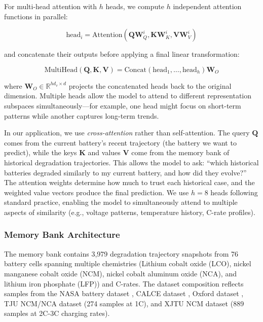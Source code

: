 \documentclass[5p,times,authoryear]{elsarticle}
\begin{document}
For multi-head attention with $h$ heads, we compute $h$ independent attention functions in parallel:

\begin{equation}
\text{head}_i = \text{Attention}(\mathbf{Q}\mathbf{W}_Q^i, \mathbf{K}\mathbf{W}_K^i, \mathbf{V}\mathbf{W}_V^i)
\label{eq:multihead_individual}
\end{equation}

and concatenate their outputs before applying a final linear transformation:

\begin{equation}
\text{MultiHead}(\mathbf{Q}, \mathbf{K}, \mathbf{V}) = \text{Concat}(\text{head}_1, \ldots, \text{head}_h)\mathbf{W}_O
\label{eq:multihead_concat}
\end{equation}

where $\mathbf{W}_O \in \mathbb{R}^{hd_v \times d}$ projects the concatenated heads back to the original dimension. Multiple heads allow the model to attend to different representation subspaces simultaneously—for example, one head might focus on short-term patterns while another captures long-term trends.

In our application, we use \textit{cross-attention} rather than self-attention. The query $\mathbf{Q}$ comes from the current battery's recent trajectory (the battery we want to predict), while the keys $\mathbf{K}$ and values $\mathbf{V}$ come from the memory bank of historical degradation trajectories. This allows the model to ask: ``which historical batteries degraded similarly to my current battery, and how did they evolve?'' The attention weights determine how much to trust each historical case, and the weighted value vectors produce the final prediction. We use $h=8$ heads following standard practice, enabling the model to simultaneously attend to multiple aspects of similarity (e.g., voltage patterns, temperature history, C-rate profiles).

\subsubsection{Memory Bank Architecture}


The memory bank contains 3,979 degradation trajectory snapshots from 76 battery cells spanning multiple chemistries (Lithium cobalt oxide (LCO), nickel manganese cobalt oxide (NCM), nickel cobalt aluminum oxide (NCA), and lithium iron phosphate (LFP)) and C-rates. The dataset composition reflects samples from the NASA battery dataset \citep{saha2007battery}, CALCE dataset \citep{he2011prognostics}, Oxford dataset \citep{birkl2017oxford}, TJU NCM/NCA dataset (274 samples at 1C), and XJTU NCM dataset (889 samples at 2C-3C charging rates).
\end{document}
